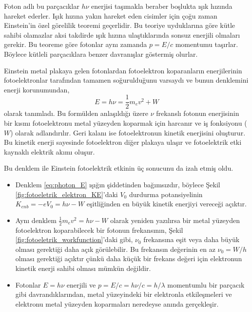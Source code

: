 \documentclass[00_kitap.tex]{subfiles}
\begin{document}
Foton adlı bu parçacıklar $h \nu$ enerjisi taşımakla beraber boşlukta ışık hızında hareket ederler. Işık hızına yakın hareket eden cisimler için çoğu zaman Einstein'in özel görelilik teoremi geçerlidir. Bu teoriye uyduklarına göre kütle sahibi olamazlar aksi takdirde ışık hızına ulaştıklarında sonsuz enerjili olmaları gerekir. Bu teoreme göre fotonlar aynı zamanda $p = E/c$ momentumu taşırlar. Böylece kütleli parçacıklara benzer davranışlar göstermiş olurlar.

Einstein metal plakaya gelen fotonlardan fotoelektron koparanların enerjilerinin fotoelektronlar tarafından tamamen soğurulduğunu varsaydı ve bunun denklemini enerji korunumundan,
\begin{equation}
\label{eq:photon_E}
E = h\nu = \frac{1}{2}m_e v^2 + W
\end{equation}
olarak tanımladı. Bu formülden anlaşıldığı üzere $\nu$ frekanslı fotonun enerjisinin bir kısmı fotoelektronu metal yüzeyden koparmak için harcanır ve iş fonksiyonu ($W$) olarak adlandırılır. Geri kalanı ise fotoelektronun kinetik enerjisini oluşturur. Bu kinetik enerji sayesinde fotoelektron diğer plakaya ulaşır ve fotoelektrik etki kaynaklı elektrik akımı oluşur.

Bu denklem ile Einstein fotoelektrik etkinin üç sonucunu da izah etmiş oldu.

\begin{itemize}
\item Denklem \ref{eq:photon_E} ışığın şiddetinden bağımsızdır, böylece Şekil \ref{fig:fotoeletrik_elektron_KE}'daki $V_0$ durdurma potansiyelinin $K_{enb}=-eV_0=h\nu - W$ eşitliğinden en büyük kinetik enerjiyi vereceği açıktır.

\item Aynı denklem $\frac{1}{2}m_e v^2 = h\nu - W$ olarak yeniden yazılırsa bir metal yüzeyden fotoelektron koparabilecek bir fotonun frekansının, Şekil \ref{fig:fotoeletrik_workfunction}'daki gibi, $\nu_0$ frekansına eşit veya daha büyük olması gerektiği daha açık görülebilir. Bu frekansın değerinin en az $\nu_0 = W/h$ olması gerektiği açıktır çünkü
daha küçük bir frekans değeri için elektronun kinetik enerji sahibi olması mümkün değildir.

\item Fotonlar $E=h\nu$ enerjili ve  $p= E/c = h\nu/c = h/\lambda$ momentumlu bir parçacık gibi davrandıklarından, metal yüzeyindeki bir elektronla etkileşmeleri ve elektronu metal yüzeyden koparmaları neredeyse anında gerçekleşir. 
\end{itemize}
\end{document}
